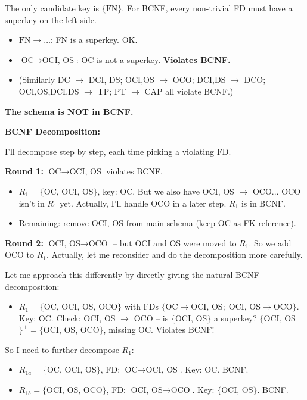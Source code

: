 \documentclass[11pt]{article}
\begin{document}
The only candidate key is $\{\text{FN}\}$. For BCNF, every non-trivial FD must have a superkey on the left side.

\begin{itemize}
  \item $\text{FN} \to \ldots$: FN is a superkey. OK.
  \item $\text{OC} \to \text{OCI, OS}$: OC is not a superkey. \textbf{Violates BCNF.}
  \item (Similarly DC $\to$ DCI, DS; OCI,OS $\to$ OCO; DCI,DS $\to$ DCO; OCI,OS,DCI,DS $\to$ TP; PT $\to$ CAP all violate BCNF.)
\end{itemize}

\textbf{The schema is NOT in BCNF.}

\medskip
\noindent\textbf{BCNF Decomposition:}

I'll decompose step by step, each time picking a violating FD.

\medskip
\noindent\textbf{Round 1:} $\text{OC} \to \text{OCI, OS}$ violates BCNF.
\begin{itemize}
  \item $R_1 = \{\text{OC, OCI, OS}\}$, key: OC. But we also have OCI, OS $\to$ OCO... OCO isn't in $R_1$ yet. Actually, I'll handle OCO in a later step. $R_1$ is in BCNF.
  \item Remaining: remove OCI, OS from main schema (keep OC as FK reference).
\end{itemize}

\noindent\textbf{Round 2:} $\text{OCI, OS} \to \text{OCO}$ -- but OCI and OS were moved to $R_1$. So we add OCO to $R_1$. Actually, let me reconsider and do the decomposition more carefully.

\medskip
Let me approach this differently by directly giving the natural BCNF decomposition:

\begin{itemize}
  \item $R_1 = \{\text{OC, OCI, OS, OCO}\}$ with FDs $\{\text{OC} \to \text{OCI, OS};\; \text{OCI, OS} \to \text{OCO}\}$. \\
  Key: OC. Check: OCI, OS $\to$ OCO -- is $\{$OCI, OS$\}$ a superkey? $\{$OCI, OS$\}^+ = \{$OCI, OS, OCO$\}$, missing OC. Violates BCNF!
\end{itemize}

So I need to further decompose $R_1$:
\begin{itemize}
  \item $R_{1a} = \{\text{OC, OCI, OS}\}$, FD: $\text{OC} \to \text{OCI, OS}$. Key: OC. BCNF. \checkmark
  \item $R_{1b} = \{\text{OCI, OS, OCO}\}$, FD: $\text{OCI, OS} \to \text{OCO}$. Key: $\{$OCI, OS$\}$. BCNF. \checkmark
\end{itemize}
\end{document}
